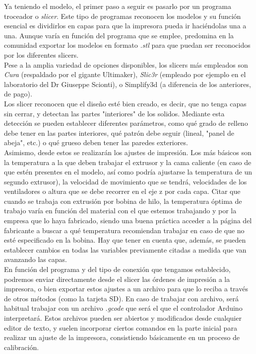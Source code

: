 \documentclass[a4paper,12pt]{article}
\begin{document}
Ya teniendo el modelo, el primer paso a seguir es pasarlo por un programa troceador o \emph{slicer}. Este tipo de programas reconocen los modelos y su función esencial es dividirlos en capas para que la impresora pueda ir haciéndolas una a una. Aunque varía en función del programa que se emplee, predomina en la comunidad exportar los modelos en formato \emph{.stl} para que puedan ser reconocidos por los diferentes slicers.\\

Pese a la amplia variedad de opciones disponibles, los slicers más empleados son \emph{Cura} (respaldado por el gigante Ultimaker), \emph{Slic3r} (empleado por ejemplo en el laboratorio del Dr Giuseppe Scionti), o Simplify3d (a diferencia de los anteriores, de pago).\\

Los slicer reconocen que el diseño esté bien creado, es decir, que no tenga capas sin cerrar, y detectan las partes "interiores" de los solidos. Mediante esta detección se pueden establecer diferentes parámetros, como qué grado de relleno debe tener en las partes interiores, qué patrón debe seguir (lineal, "panel de abeja", etc.) o qué grueso deben tener las paredes exteriores.\\

Asimismo, desde estos se realizarán los ajustes de impresión. Los más básicos son la temperatura a la que deben trabajar el extrusor y la cama caliente (en caso de que estén presentes en el modelo, así como podría ajustarse la temperatura de un segundo extrusor), la velocidad de movimiento que se tendrá, velocidades de los ventiladores o altura que se debe recorrer en el eje z por cada capa. Citar que cuando se trabaja con extrusión por bobina de hilo, la temperatura óptima de trabajo varía en función del material con el que estemos trabajando y por la empresa que lo haya fabricado, siendo una buena práctica acceder a la página del fabricante a buscar a qué temperatura recomiendan trabajar en caso de que no esté especificado en la bobina. Hay que tener en cuenta que, además, se pueden establecer cambios en todas las variables previamente citadas a medida que van avanzando las capas.\\

En función del programa y del tipo de conexión que tengamos establecido, podremos enviar directamente desde el slicer las órdenes de impresión a la impresora, o bien exportar estos ajustes a un archivo para que lo reciba a través de otros métodos (como la tarjeta SD). En caso de trabajar con archivo, será habitual trabajar con un archivo \emph{.gcode} que será el que el controlador Arduino interpretará. Estos archivos pueden ser abiertos y modificados desde cualquier editor de texto, y suelen incorporar ciertos comandos en la parte inicial para realizar un ajuste de la impresora, consistiendo básicamente en un proceso de calibración.\\
\end{document}
